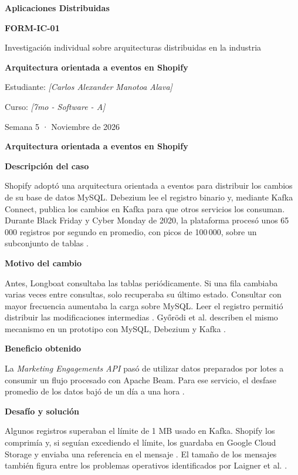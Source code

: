 \documentclass[12pt,a4paper]{article}
\newcommand{\tituloPrincipal}[1]{%
  {\fontsize{16}{19}\selectfont\bfseries #1\par}%
  \vspace{5pt}%
}
\newcommand{\apartado}[1]{%
  \par\addvspace{7pt}%
  {\fontsize{14}{17}\selectfont\bfseries #1\par}\nopagebreak[4]%
}
\begin{document}
\begin{titlepage}
  \centering
  \vspace*{\fill}
  {\bfseries Aplicaciones Distribuidas\par}
  \vspace{16pt}
  {\bfseries FORM-IC-01\par}
  \vspace{5pt}
  Investigación individual sobre arquitecturas distribuidas en la industria\par
  \vspace{22pt}
  \tituloPrincipal{Arquitectura orientada a eventos en Shopify}
  \vspace{20pt}
  Estudiante: \textit{[Carlos Alexander Manotoa Alava]}\par
  Curso: \textit{[7mo - Software - A]}\par
  \vspace{16pt}
  Semana 5 · Noviembre de 2026\par
  \vspace*{\fill}
\end{titlepage}

\tituloPrincipal{Arquitectura orientada a eventos en Shopify}

\apartado{Descripción del caso}
Shopify adoptó una arquitectura orientada a eventos para distribuir los cambios de su base de datos MySQL. Debezium lee el registro binario y, mediante Kafka Connect, publica los cambios en Kafka para que otros servicios los consuman. Durante Black Friday y Cyber Monday de 2020, la plataforma procesó unos 65\,000 registros por segundo en promedio, con picos de 100\,000, sobre un subconjunto de tablas \cite{martin2021shopify}.

\apartado{Motivo del cambio}
Antes, Longboat consultaba las tablas periódicamente. Si una fila cambiaba varias veces entre consultas, solo recuperaba su último estado. Consultar con mayor frecuencia aumentaba la carga sobre MySQL. Leer el registro permitió distribuir las modificaciones intermedias \cite{martin2021shopify}. Győrödi et al. describen el mismo mecanismo en un prototipo con MySQL, Debezium y Kafka \cite{gyorodi2023synchronization}.

\apartado{Beneficio obtenido}
La \textit{Marketing Engagements API} pasó de utilizar datos preparados por lotes a consumir un flujo procesado con Apache Beam. Para ese servicio, el desfase promedio de los datos bajó de un día a una hora \cite{martin2021shopify}.

\apartado{Desafío y solución}
Algunos registros superaban el límite de 1 MB usado en Kafka. Shopify los comprimía y, si seguían excediendo el límite, los guardaba en Google Cloud Storage y enviaba una referencia en el mensaje \cite{martin2021shopify}. El tamaño de los mensajes también figura entre los problemas operativos identificados por Laigner et al. \cite{laigner2026eventmanagement}.
\end{document}

